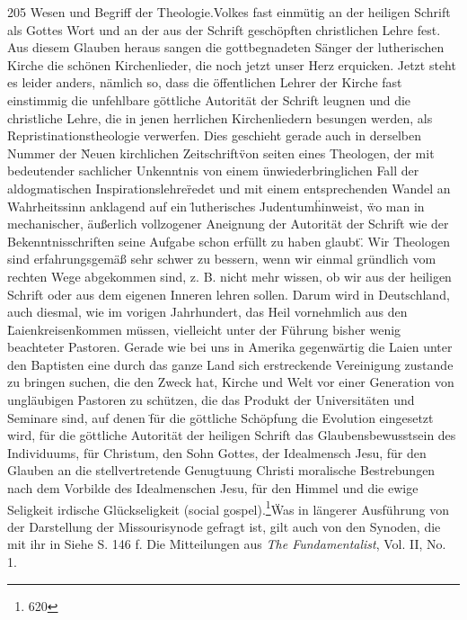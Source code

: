 205 Wesen und Begriff der Theologie.\n\ndes Volkes fast einmütig an der heiligen Schrift als Gottes Wort und an der aus der Schrift geschöpften christlichen Lehre fest. Aus diesem Glauben heraus sangen die gottbegnadeten Sänger der lutherischen Kirche die schönen Kirchenlieder, die noch jetzt unser Herz erquicken. Jetzt steht es leider anders, nämlich so, dass die öffentlichen Lehrer der Kirche fast einstimmig die unfehlbare göttliche Autorität der Schrift leugnen und die christliche Lehre, die in jenen herrlichen Kirchenliedern besungen werden, als Repristinationstheologie verwerfen. Dies geschieht gerade auch in derselben Nummer der \"Neuen kirchlichen Zeitschrift\" von seiten eines Theologen, der mit bedeutender sachlicher Unkenntnis von einem \"unwiederbringlichen Fall der aldogmatischen Inspirationslehre\" redet und mit einem entsprechenden Wandel an Wahrheitssinn anklagend auf ein \"lutherisches Judentum\" hinweist, \"wo man in mechanischer, äußerlich vollzogener Aneignung der Autorität der Schrift wie der Bekenntnisschriften seine Aufgabe schon erfüllt zu haben glaubt\". Wir Theologen sind erfahrungsgemäß sehr schwer zu bessern, wenn wir einmal gründlich vom rechten Wege abgekommen sind, z. B. nicht mehr wissen, ob wir aus der heiligen Schrift oder aus dem eigenen Inneren lehren sollen. Darum wird in Deutschland, auch diesmal, wie im vorigen Jahrhundert, das Heil vornehmlich aus den \"Laienkreisen\" kommen müssen, vielleicht unter der Führung bisher wenig beachteter Pastoren. Gerade wie bei uns in Amerika gegenwärtig die Laien unter den Baptisten eine durch das ganze Land sich erstreckende Vereinigung zustande zu bringen suchen, die den Zweck hat, Kirche und Welt vor einer Generation von ungläubigen Pastoren zu schützen, die das Produkt der Universitäten und Seminare sind, auf denen \"für die göttliche Schöpfung die Evolution eingesetzt wird, für die göttliche Autorität der heiligen Schrift das Glaubensbewusstsein des Individuums, für Christum, den Sohn Gottes, der Idealmensch Jesu, für den Glauben an die stellvertretende Genugtuung Christi moralische Bestrebungen nach dem Vorbilde des Idealmenschen Jesu, für den Himmel und die ewige Seligkeit irdische Glückseligkeit (social gospel).\"\footnote{620}\n\n\"Was in längerer Ausführung von der Darstellung der Missourisynode gefragt ist, gilt auch von den Synoden, die mit ihr in\n\n{} Siehe S. 146 f. Die Mitteilungen aus \emph{The Fundamentalist}, Vol. II, No. 1.